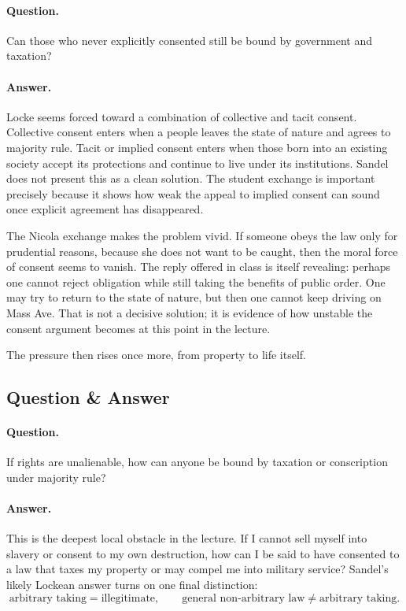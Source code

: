 \paragraph{Question.} Can those who never explicitly consented still be bound by government and taxation?

\paragraph{Answer.} Locke seems forced toward a combination of collective and tacit consent. Collective consent enters when a people leaves the state of nature and agrees to majority rule. Tacit or implied consent enters when those born into an existing society accept its protections and continue to live under its institutions. Sandel does not present this as a clean solution. The student exchange is important precisely because it shows how weak the appeal to implied consent can sound once explicit agreement has disappeared.

The Nicola exchange makes the problem vivid. If someone obeys the law only for prudential reasons, because she does not want to be caught, then the moral force of consent seems to vanish. The reply offered in class is itself revealing: perhaps one cannot reject obligation while still taking the benefits of public order. One may try to return to the state of nature, but then one cannot keep driving on Mass Ave. That is not a decisive solution; it is evidence of how unstable the consent argument becomes at this point in the lecture.

The pressure then rises once more, from property to life itself.

\subsection{Question \& Answer}

\paragraph{Question.} If rights are unalienable, how can anyone be bound by taxation or conscription under majority rule?

\paragraph{Answer.} This is the deepest local obstacle in the lecture. If I cannot sell myself into slavery or consent to my own destruction, how can I be said to have consented to a law that taxes my property or may compel me into military service? Sandel's likely Lockean answer turns on one final distinction:
\begin{equation}
\text{arbitrary taking}=\text{illegitimate},
\qquad
\text{general non-arbitrary law}\neq \text{arbitrary taking}.
\end{equation}

